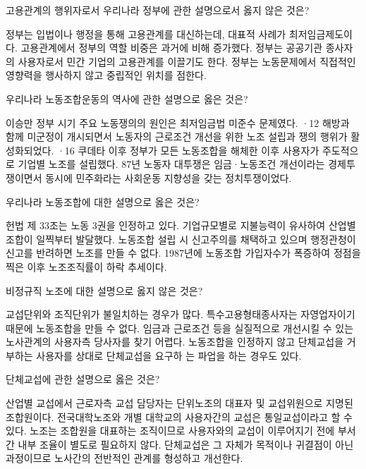 \documentclass[11pt,answers]{exam}
\begin{document}
\begin{questions}

\question[2] 고용관계의 행위자로서 우리나라 정부에 관한 설명으로서 옳지 않은 것은?
    \begin{choices}
    \choice\relax 정부는 입법이나 행정을 통해 고용관계를 대신하는데, 대표적 사례가 최저임금제도이다.
    \choice\relax 고용관계에서 정부의 역할 비중은 과거에 비해 증가했다.
    \choice\relax 정부는 공공기관 종사자의 사용자로서 민간 기업의 고용관계를 이끌기도 한다.
    \CorrectChoice\relax 정부는 노동문제에서 직접적인 영향력을 행사하지 않고 중립적인 위치를 점한다.
    \end{choices}

\question[2] 우리나라 노동조합운동의 역사에 관한 설명으로 옳은 것은?
    \begin{choices}
    \choice\relax 이승만 정부 시기 주요 노동쟁의의 원인은 최저임금법 미준수 문제였다.
    \choice{}·12 해방과 함께 미군정이 개시되면서 노동자의 근로조건 개선을 위한 노조 설립과 쟁의 행위가 활성화되었다.
    \choice{}·16 쿠데타 이후 정부가 모든 노동조합을 해체한 이후 사용자가 주도적으로 기업별 노조를 설립했다.
    \CorrectChoice\relax 87년 노동자 대투쟁은 임금·노동조건 개선이라는 경제투쟁이면서 동시에 민주화라는 사회운동 지향성을 갖는 정치투쟁이었다.
    \end{choices}

\question[2] 우리나라 노동조합에 대한 설명으로 옳은 것은?
    \begin{choices}
    \CorrectChoice\relax 헌법 제 33조는 노동 3권을 인정하고 있다.
    \choice\relax 기업규모별로 지불능력이 유사하여 산업별 조합이 일찍부터 발달했다.
    \choice\relax 노동조합 설립 시 신고주의를 채택하고 있으며 행정관청이 신고를 반려하면 노조를 만들 수 없다.
    \choice\relax 1987년에 노동조합 가입자수가 폭증하여 정점을 찍은 이후 노조조직률이 하락 추세이다.
    \end{choices}

\question[2] 비정규직 노조에 대한 설명으로 옳지 않은 것은?
    \begin{choices}
    \choice\relax 교섭단위와 조직단위가 불일치하는 경우가 많다.
    \CorrectChoice\relax 특수고용형태종사자는 자영업자이기 때문에 노동조합을 만들 수 없다.
    \choice\relax 임금과 근로조건 등을 실질적으로 개선시킬 수 있는 노사관계의 사용자측 당사자를 찾기 어렵다.
    \choice\relax 노동조합을 인정하지 않고 단체교섭을 거부하는 사용자를 상대로 단체교섭을 요구하 는 파업을 하는 경우도 있다.
    \end{choices}

\question[2] 단체교섭에 관한 설명으로 옳은 것은?
    \begin{choices}
    \choice\relax 산업별 교섭에서 근로자측 교섭 담당자는 단위노조의 대표자 및 교섭위원으로 지명된 조합원이다.
    \choice\relax 전국대학노조와 개별 대학교의 사용자간의 교섭은 통일교섭이라고 할 수 있다.
    \choice\relax 노조는 조합원을 대표하는 조직이므로 사용자와의 교섭이 이루어지기 전에 부서간 내부 조율이 별도로 필요하지 않다.
    \CorrectChoice\relax 단체교섭은 그 자체가 목적이나 귀결점이 아닌 과정이므로 노사간의 전반적인 관계를 형성하고 개선한다.
    \end{choices}


\end{questions}
\end{document}
